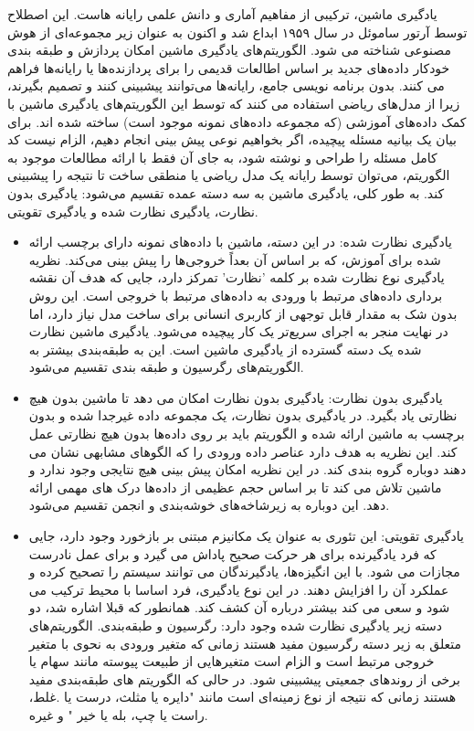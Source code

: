 \documentclass{CSICC2020}
\begin{document}
یادگیری ماشین، ترکیبی از مفاهیم آماری و دانش علمی رایانه هاست. این اصطلاح توسط آرتور ساموئل در سال ۱۹۵۹ ابداع شد و اکنون به عنوان زیر مجموعه‌ای از هوش مصنوعی شناخته می شود. الگوریتم‌های یادگیری ماشین امکان پردازش و طبقه بندی خودکار داده‌های جدید بر اساس اطالعات قدیمی را برای پردازنده‌ها یا رایانه‌ها فراهم می کنند. بدون برنامه نویسی جامع، رایانه‌ها می‌توانند پیشبینی کنند و تصمیم بگیرند، زیرا از مدل‌های ریاضی استفاده می کنند که توسط این الگوریتم‌های یادگیری ماشین با کمک داده‌های آموزشی (که مجموعه داده‌های نمونه موجود است) ساخته شده اند. برای بیان یک بیانیه مسئله پیچیده، اگر بخواهیم نوعی پیش بینی انجام دهیم، الزام نیست کد کامل مسئله را طراحی و نوشته شود، به جای آن فقط با ارائه مطالعات موجود به الگوریتم، می‌توان توسط رایانه یک مدل ریاضی یا منطقی ساخت تا نتیجه را پیشبینی کند. به طور کلی، یادگیری ماشین به سه دسته عمده تقسیم می‌شود: یادگیری بدون نظارت، یادگیری نظارت شده و یادگیری تقویتی.
\begin{itemize}
\item 
یادگیری نظارت شده: 
 در این دسته، ماشین با داده‌های نمونه دارای برچسب ارائه شده برای آموزش، که بر اساس آن بعداً خروجی‌ها را پیش بینی می‌کند. نظریه یادگیری نوع نظارت شده بر کلمه 'نظارت' تمرکز دارد، جایی که هدف آن نقشه برداری داده‌های مرتبط با ورودی به داده‌های مرتبط با خروجی است. این روش بدون شک به مقدار قابل توجهی از کاربری انسانی برای ساخت مدل نیاز دارد، اما در نهایت منجر به اجرای سریع‌تر یک کار پیچیده می‌شود. یادگیری ماشین نظارت شده یک دسته گسترده از یادگیری ماشین است. این به طبقه‌بندی بیشتر به الگوریتم‌های رگرسیون و طبقه بندی تقسیم می‌شود.
\item
یادگیری بدون نظارت:
 یادگیری بدون نظارت امکان می دهد تا ماشین بدون هیچ نظارتی یاد بگیرد. در یادگیری بدون نظارت، یک مجموعه داده غیرجدا شده و بدون برچسب به ماشین ارائه شده و الگوریتم باید بر روی داده‌ها بدون هیچ نظارتی عمل کند. این نظریه به هدف دارد عناصر داده ورودی را که الگوهای مشابهی نشان می دهند دوباره گروه بندی کند. در این نظریه امکان پیش بینی هیچ نتایجی وجود ندارد و ماشین تلاش می کند تا بر اساس حجم عظیمی از داده‌ها درک های مهمی ارائه دهد. این دوباره به زیرشاخه‌های خوشه‌بندی و انجمن تقسیم می‌شود.
\item
یادگیری تقویتی:
 این تئوری به عنوان یک مکانیزم مبتنی بر بازخورد وجود دارد، جایی که فرد یادگیرنده برای هر حرکت صحیح پاداش می گیرد و برای عمل نادرست مجازات می شود. با این انگیزه‌ها، یادگیرندگان می توانند سیستم را تصحیح کرده و عملکرد آن را افزایش دهند. در این نوع یادگیری، فرد اساسا با محیط ترکیب می شود و سعی می کند بیشتر درباره آن کشف کند. همانطور که قبلا اشاره شد، دو دسته زیر یادگیری نظارت شده وجود دارد: رگرسیون و طبقه‌بندی. الگوریتم‌های متعلق به زیر دسته رگرسیون مفید هستند زمانی که متغیر ورودی به نحوی با متغیر خروجی مرتبط است و الزام است متغیرهایی از طبیعت پیوسته مانند سهام یا برخی از روندهای جمعیتی پیشبینی شود. در حالی که الگوریتم های طبقه‌بندی مفید هستند زمانی که نتیجه از نوع زمینه‌ای است مانند "دایره یا مثلث، درست یا .غلط، راست یا چپ، بله یا خیر " و غیره.

\end{itemize}
\end{document}
